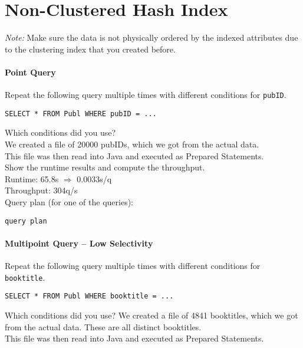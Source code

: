 \documentclass[11pt]{scrartcl}
\begin{document}
\section{Non-Clustered Hash Index}

\noindent \emph{Note:} Make sure the data is not physically ordered by
the indexed attributes due to the clustering index that you created
before.

\paragraph{Point Query}

Repeat the following query multiple times with different conditions for {\tt pubID}.

{\small
\begin{verbatim}
SELECT * FROM Publ WHERE pubID = ...
\end{verbatim}
}

\noindent
Which conditions did you use?\\
We created a file of 20000 pubIDs, which we got from the actual data.\\
This file was then read into Java and executed as Prepared Statements.\\

\smallskip\noindent
Show the runtime results and compute the throughput.\\
Runtime: 65.8s $\Rightarrow$ 0.0033s/q\\
Throughput: 304q/s\\

\smallskip\noindent
Query plan (for one of the queries):
{\small
\begin{verbatim}
query plan
\end{verbatim}
}


\paragraph{Multipoint Query -- Low Selectivity}

Repeat the following query multiple times with different conditions for {\tt booktitle}.

{\small
\begin{verbatim}
SELECT * FROM Publ WHERE booktitle = ...
\end{verbatim}
}

\noindent
Which conditions did you use?
We created a file of 4841 booktitles, which we got from the actual data. These are all distinct booktitles.\\
This file was then read into Java and executed as Prepared Statements.\\
\end{document}
